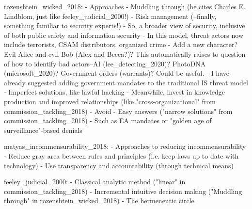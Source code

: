 rozenshtein_wicked_2018:
- Approaches
  - Muddling through (he cites Charles E. Lindblom, just like feeley_judicial_2000!)
  - Risk management (--finally, something familiar to security experts!)
    - So, a broader view of security, inclusive of both public safety and information security
    - In this model, threat actors now include terrorists, CSAM distributors, organized crime
      - Add a new character? Evil Alice and evil Bob (Alex and Becca?)? This automatically raises to question of how to
          identify bad actors--AI (lee_detecting_2020)? PhotoDNA (microsoft_2020)? Government orders (warrants)? Could
          be useful.
    - I have already suggested adding government mandates to the traditional IS threat model
  - Imperfect solutions, like lawful hacking
  - Meanwhile, invest in knowledge production and improved relationships (like "cross-organizational" from
      commission_tackling_2018)
- Avoid
  - Easy answers ("narrow solutions" from commission_tackling_2018)
    - Such as EA mandates or "golden age of surveillance"-based denials

matyas_incommensurability_2018:
- Approaches to reducing incommensurability
  - Reduce gray area between rules and principles (i.e. keep laws up to date with technology)
  - Use transparency and accountability (through technical means)

feeley_judicial_2000:
- Classical analytic method ("linear" in commission_tackling_2018)
- Incremental intuitive decision making ("Muddling through" in rozenshtein_wicked_2018)
- The hermeneutic circle



